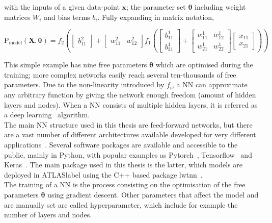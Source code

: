 with the inputs of a given data-point $\mathbf{x}$; the parameter set $\boldsymbol{\theta}$ including weight matrices $W_i$ and bias terms $b_i$. Fully expanding in matrix notation,

\begin{equation}
    \text{P}_\text{model}(\mathbf{X},\boldsymbol{\theta}) = f_2\left( \begin{bmatrix} b_{11}^2 \end{bmatrix}+ \begin{bmatrix} w_{11}^2 & w_{12}^2\end{bmatrix}f_1\left( \begin{bmatrix} b_{11}^1 \\  
                                                            b_{21}^1  \end{bmatrix}+ \begin{bmatrix} 
    w_{11}^1 & w_{12}^1 \\ 
    w_{21}^1 & w_{22}^1\end{bmatrix} \begin{bmatrix}
        x_{11}\\
        x_{21}
    \end{bmatrix} \right) \right)
\end{equation}

This simple example has nine free parameters $\boldsymbol{\theta}$ which are optimised during the training; more complex networks easily reach several ten-thousands of free parameters. Due to the non-linearity introduced by $f_i$, a NN can approximate any arbitrary function by giving the network enough freedom (amount of hidden layers and nodes). When a NN consists of multiple hidden layers, it is referred as a deep learning~\cite{Goodfellow-et-al-2016} algorithm.\\

The main NN structure used in this thesis are feed-forward networks, but there are a vast number of different architectures available developed for very different applications~\cite{livingreview}. Several software packages are available and accessible to the public,  mainly in Python, with popular examples as Pytorch~\cite{NEURIPS2019_9015}, Tensorflow~\cite{tensorflow2015-whitepaper} and Keras~\cite{chollet2015keras}. The main package used in this thesis is the latter, which models are deployed in \acrshort{ATLASlabel} using the C++ based package lwtnn~\cite{lwtnn}.\\

The training of a NN is the process consisting on the optimisation of the free parameters $\boldsymbol{\theta}$ using gradient descent. Other parameters that affect the model and are manually set are called hyperparameter, which include for example the number of layers and nodes.\\

